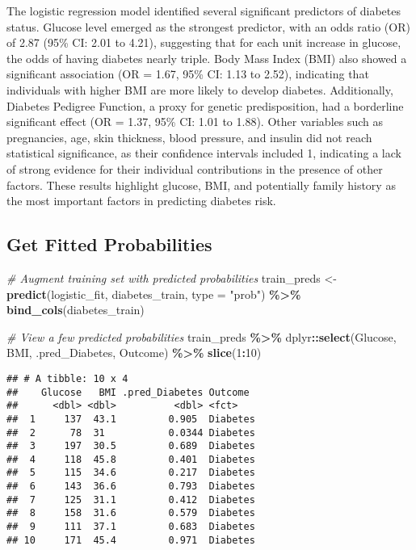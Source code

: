\documentclass[
]{article}
\newenvironment{Shaded}{\begin{snugshade}}{\end{snugshade}}
\newcommand{\AttributeTok}[1]{\textcolor[rgb]{0.13,0.29,0.53}{#1}}
\newcommand{\CommentTok}[1]{\textcolor[rgb]{0.56,0.35,0.01}{\textit{#1}}}
\newcommand{\DecValTok}[1]{\textcolor[rgb]{0.00,0.00,0.81}{#1}}
\newcommand{\FunctionTok}[1]{\textcolor[rgb]{0.13,0.29,0.53}{\textbf{#1}}}
\newcommand{\NormalTok}[1]{#1}
\newcommand{\OtherTok}[1]{\textcolor[rgb]{0.56,0.35,0.01}{#1}}
\newcommand{\SpecialCharTok}[1]{\textcolor[rgb]{0.81,0.36,0.00}{\textbf{#1}}}
\newcommand{\StringTok}[1]{\textcolor[rgb]{0.31,0.60,0.02}{#1}}
\begin{document}
The logistic regression model identified several significant predictors
of diabetes status. Glucose level emerged as the strongest predictor,
with an odds ratio (OR) of 2.87 (95\% CI: 2.01 to 4.21), suggesting that
for each unit increase in glucose, the odds of having diabetes nearly
triple. Body Mass Index (BMI) also showed a significant association (OR
= 1.67, 95\% CI: 1.13 to 2.52), indicating that individuals with higher
BMI are more likely to develop diabetes. Additionally, Diabetes Pedigree
Function, a proxy for genetic predisposition, had a borderline
significant effect (OR = 1.37, 95\% CI: 1.01 to 1.88). Other variables
such as pregnancies, age, skin thickness, blood pressure, and insulin
did not reach statistical significance, as their confidence intervals
included 1, indicating a lack of strong evidence for their individual
contributions in the presence of other factors. These results highlight
glucose, BMI, and potentially family history as the most important
factors in predicting diabetes risk.

\subsection{Get Fitted Probabilities}\label{get-fitted-probabilities}

\begin{Shaded}
\begin{Highlighting}[]
\CommentTok{\# Augment training set with predicted probabilities}
\NormalTok{train\_preds }\OtherTok{\textless{}{-}} \FunctionTok{predict}\NormalTok{(logistic\_fit, diabetes\_train, }\AttributeTok{type =} \StringTok{"prob"}\NormalTok{) }\SpecialCharTok{\%\textgreater{}\%}
  \FunctionTok{bind\_cols}\NormalTok{(diabetes\_train)}

\CommentTok{\# View a few predicted probabilities}
\NormalTok{train\_preds }\SpecialCharTok{\%\textgreater{}\%}
\NormalTok{  dplyr}\SpecialCharTok{::}\FunctionTok{select}\NormalTok{(Glucose, BMI, }\StringTok{\textasciigrave{}}\AttributeTok{.pred\_Diabetes}\StringTok{\textasciigrave{}}\NormalTok{, Outcome) }\SpecialCharTok{\%\textgreater{}\%}
  \FunctionTok{slice}\NormalTok{(}\DecValTok{1}\SpecialCharTok{:}\DecValTok{10}\NormalTok{)}
\end{Highlighting}
\end{Shaded}

\begin{verbatim}
## # A tibble: 10 x 4
##    Glucose   BMI .pred_Diabetes Outcome 
##      <dbl> <dbl>          <dbl> <fct>   
##  1     137  43.1         0.905  Diabetes
##  2      78  31           0.0344 Diabetes
##  3     197  30.5         0.689  Diabetes
##  4     118  45.8         0.401  Diabetes
##  5     115  34.6         0.217  Diabetes
##  6     143  36.6         0.793  Diabetes
##  7     125  31.1         0.412  Diabetes
##  8     158  31.6         0.579  Diabetes
##  9     111  37.1         0.683  Diabetes
## 10     171  45.4         0.971  Diabetes
\end{verbatim}
\end{document}
